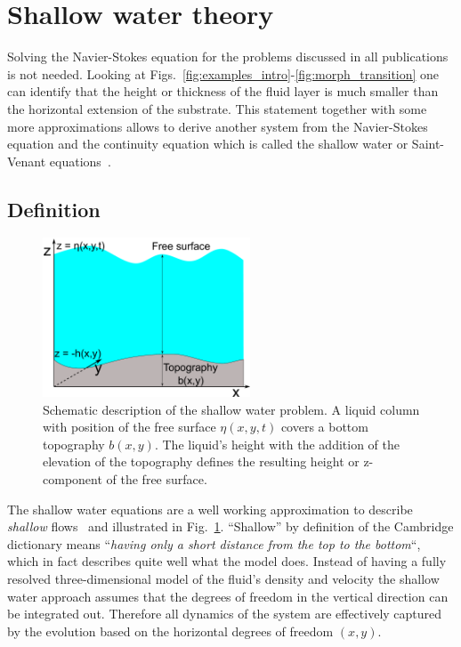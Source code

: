 \section{Shallow water theory}
\label{sec:theory_shallow_water}
Solving the Navier-Stokes equation for the problems discussed in all publications is not needed.
Looking at Figs.~\ref{fig:examples_intro}-\ref{fig:morph_transition} one can identify that the height or thickness of the fluid layer is much smaller than the horizontal extension of the substrate.
This statement together with some more approximations allows to derive another system from the Navier-Stokes equation and the continuity equation which is called the shallow water or Saint-Venant equations~\cite{bTheorieMouvementNonpermanent1871}.

\subsection{Definition}
\begin{figure}
    \centering
    \includegraphics[width=0.55\textwidth]{graphics/simple_shallow_water.pdf}
    \caption{Schematic description of the shallow water problem. A liquid column with position of the free surface $\eta(x,y,t)$ covers a bottom topography $b(x,y)$.
    The liquid's height with the addition of the elevation of the topography defines the resulting height or z-component of the free surface.}
    \label{fig:shallow_water_drawing}
\end{figure}

The shallow water equations are a well working approximation to describe \textit{shallow} flows~\cite{tanShallowWaterHydrodynamics1992} and illustrated in Fig.~\ref{fig:shallow_water_drawing}.
``Shallow'' by definition of the Cambridge dictionary means ``\textit{having only a short distance from the top to the bottom}``, which in fact describes quite well what the model does.
Instead of having a fully resolved three-dimensional model of the fluid's density and velocity the shallow water approach assumes that the degrees of freedom in the vertical direction can be integrated out. 
Therefore all dynamics of the system are effectively captured by the evolution based on the horizontal degrees of freedom $(x,y)$.

